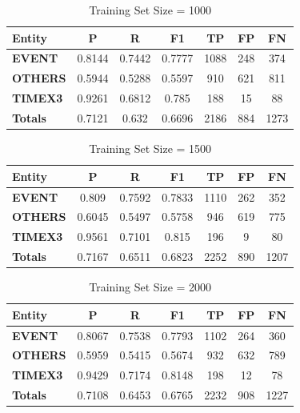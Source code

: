 \documentclass[letterpaper, 10 pt, conference]{ieeeconf}
\begin{document}
\begin{table}[!htpb]
\centering
\caption{Training Set Size = 1000}
\label{t6}
\begin{tabular}{lcccccc}
\textbf{Entity} & \textbf{P} & \textbf{R} & \textbf{F1} & \textbf{TP} & \textbf{FP} & \textbf{FN} \\
\hline
\textbf{EVENT}  & 0.8144     & 0.7442     & 0.7777      & 1088        & 248         & 374         \\
\textbf{OTHERS} & 0.5944     & 0.5288     & 0.5597      & 910         & 621         & 811         \\
\textbf{TIMEX3} & 0.9261     & 0.6812     & 0.785       & 188         & 15          & 88          \\
\textbf{Totals} & 0.7121     & 0.632      & 0.6696      & 2186        & 884         & 1273       
\end{tabular}
\end{table}

\begin{table}[!htpb]
\centering
\caption{Training Set Size = 1500}
\label{t7}
\begin{tabular}{lcccccc}
\textbf{Entity} & \textbf{P} & \textbf{R} & \textbf{F1} & \textbf{TP} & \textbf{FP} & \textbf{FN} \\
\hline
\textbf{EVENT}  & 0.809      & 0.7592     & 0.7833      & 1110        & 262         & 352         \\
\textbf{OTHERS} & 0.6045     & 0.5497     & 0.5758      & 946         & 619         & 775         \\
\textbf{TIMEX3} & 0.9561     & 0.7101     & 0.815       & 196         & 9           & 80          \\
\textbf{Totals} & 0.7167     & 0.6511     & 0.6823      & 2252        & 890         & 1207       
\end{tabular}
\end{table}

\begin{table}[!htpb]
\centering
\caption{Training Set Size = 2000}
\label{t8}
\begin{tabular}{lcccccc}
\textbf{Entity} & \textbf{P} & \textbf{R} & \textbf{F1} & \textbf{TP} & \textbf{FP} & \textbf{FN} \\
\hline
\textbf{EVENT}  & 0.8067     & 0.7538     & 0.7793      & 1102        & 264         & 360         \\
\textbf{OTHERS} & 0.5959     & 0.5415     & 0.5674      & 932         & 632         & 789         \\
\textbf{TIMEX3} & 0.9429     & 0.7174     & 0.8148      & 198         & 12          & 78          \\
\textbf{Totals} & 0.7108     & 0.6453     & 0.6765      & 2232        & 908         & 1227       
\end{tabular}
\end{table}
\end{document}
